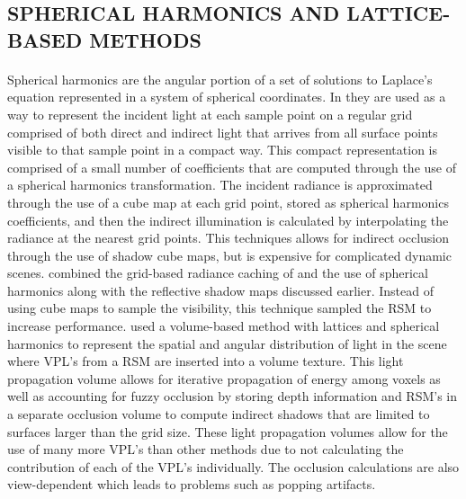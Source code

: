\subsection{SPHERICAL HARMONICS AND LATTICE-BASED METHODS}
\paragraph{}
Spherical harmonics are the angular portion of a set of solutions to Laplace's equation represented in a system of spherical coordinates.  In \cite{Nijasure2005} they are used as a way to represent the incident light at each sample point on a regular grid comprised of both direct and indirect light that arrives from all surface points visible to that sample point in a compact way.  This compact representation is comprised of a small number of coefficients that are computed through the use of a spherical harmonics transformation.  The incident radiance is approximated through the use of a cube map at each grid point, stored as spherical harmonics coefficients, and then the indirect illumination is calculated by interpolating the radiance at the nearest grid points.  This techniques allows for indirect occlusion through the use of shadow cube maps, but is expensive for complicated dynamic scenes.  \cite{Papaioannou2011} combined the grid-based radiance caching of \cite{Nijasure2005} and the use of spherical harmonics along with the reflective shadow maps discussed earlier.  Instead of using cube maps to sample the visibility, this technique sampled the RSM to increase performance.  \cite{Kaplanyan2010} used a volume-based method with lattices and spherical harmonics to represent the spatial and angular distribution of light in the scene where VPL's from a RSM are inserted into a volume texture.  This light propagation volume allows for iterative propagation of energy among voxels as well as accounting for fuzzy occlusion by storing depth information and RSM's in a separate occlusion volume to compute indirect shadows that are limited to surfaces larger than the grid size.  These light propagation volumes allow for the use of many more VPL's than other methods due to not calculating the contribution of each of the VPL's individually.  The occlusion calculations are also view-dependent which leads to problems such as popping artifacts.